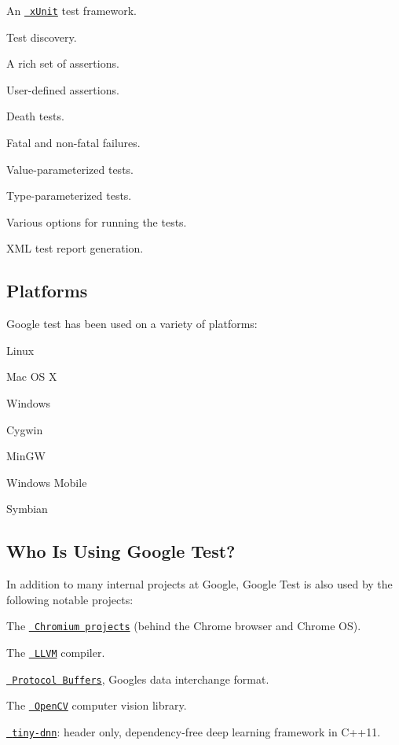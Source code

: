 \begin{DoxyItemize}
\item An \href{https://en.wikipedia.org/wiki/XUnit}{\texttt{ x\+Unit}} test framework.
\item Test discovery.
\item A rich set of assertions.
\item User-\/defined assertions.
\item Death tests.
\item Fatal and non-\/fatal failures.
\item Value-\/parameterized tests.
\item Type-\/parameterized tests.
\item Various options for running the tests.
\item X\+ML test report generation.
\end{DoxyItemize}

\subsection*{Platforms}

Google test has been used on a variety of platforms\+:


\begin{DoxyItemize}
\item Linux
\item Mac OS X
\item Windows
\item Cygwin
\item Min\+GW
\item Windows Mobile
\item Symbian
\end{DoxyItemize}

\subsection*{Who Is Using Google Test?}

In addition to many internal projects at Google, Google Test is also used by the following notable projects\+:


\begin{DoxyItemize}
\item The \href{http://www.chromium.org/}{\texttt{ Chromium projects}} (behind the Chrome browser and Chrome OS).
\item The \href{http://llvm.org/}{\texttt{ L\+L\+VM}} compiler.
\item \href{https://github.com/google/protobuf}{\texttt{ Protocol Buffers}}, Google\textquotesingle{}s data interchange format.
\item The \href{http://opencv.org/}{\texttt{ Open\+CV}} computer vision library.
\item \href{https://github.com/tiny-dnn/tiny-dnn}{\texttt{ tiny-\/dnn}}\+: header only, dependency-\/free deep learning framework in C++11.
\end{DoxyItemize}

